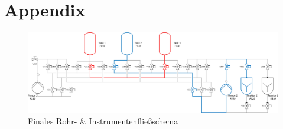 \chapter{Appendix}
	\label{appendix}
	
	\begin{figure}[h!]
  		\centering
      	\includegraphics[width=1\textwidth]{graphics/implementation/RI_Impl}
  		\caption{Finales Rohr- \& Instrumentenfließschema}
	\end{figure}	